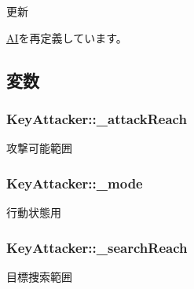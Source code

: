 更新 



\hyperlink{class_a_i_a59e5ab0650eb03f2e71bc8930fd9a8d5}{A\-I}を再定義しています。



\subsection{変数}
\hypertarget{class_key_attacker_a20541471e6d38fcbe019f5bc60652275}{
\subsubsection[{\-\_\-attack\-Reach}]{ Key\-Attacker\-::\-\_\-attack\-Reach\hspace{0.3cm}{\ttfamily [protected]}}}\label{class_key_attacker_a20541471e6d38fcbe019f5bc60652275}


攻撃可能範囲 

\hypertarget{class_key_attacker_a666924d4aac349f5ac2d6d340d1c8637}{
\subsubsection[{\-\_\-mode}]{ Key\-Attacker\-::\-\_\-mode\hspace{0.3cm}{\ttfamily [protected]}}}\label{class_key_attacker_a666924d4aac349f5ac2d6d340d1c8637}


行動状態用 

\hypertarget{class_key_attacker_ad9928ab6bf533ef686477cf4dc1574a2}{
\subsubsection[{\-\_\-search\-Reach}]{ Key\-Attacker\-::\-\_\-search\-Reach\hspace{0.3cm}{\ttfamily [protected]}}}\label{class_key_attacker_ad9928ab6bf533ef686477cf4dc1574a2}


目標捜索範囲 

